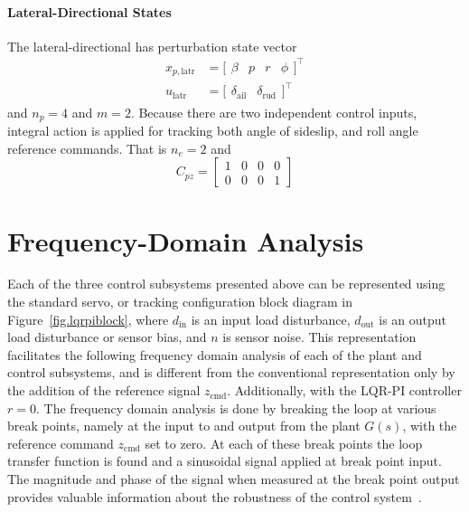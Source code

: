 \paragraph{Lateral-Directional States}
The lateral-directional has perturbation state vector
\begin{equation}
  \label{lat_statevector_eqn}
  \begin{split}
    x_{p,\text{latr}}&=
    \bigr[
    \begin{array}{cccc}
      \beta & p & r & \phi
    \end{array}\bigr]^{\top} \\
    u_{\text{latr}}&=
    \bigr[
    \begin{array}{cc}
      \delta_{\text{ail}} & \delta_{\text{rud}}
    \end{array}\bigr]^{\top}
  \end{split}
\end{equation}
and $n_{p}=4$ and $m=2$.
Because there are two independent control inputs, integral action is applied for tracking both angle of sideslip, and roll angle reference commands.
That is $n_{e}=2$ and
\begin{equation}
  C_{pz}=
  \left[
  \begin{array}{cccc}
    1 & 0 & 0 & 0 \\
    0 & 0 & 0 & 1
  \end{array}\right]
\end{equation}

\section{Frequency-Domain Analysis}

Each of the three control subsystems presented above can be represented using the standard servo, or tracking configuration block diagram in Figure~\ref{fig.lqrpiblock}, where $d_{\text{in}}$ is an input load disturbance, $d_{\text{out}}$ is an output load disturbance or sensor bias, and $n$ is sensor noise.
This representation facilitates the following frequency domain analysis of each of the plant and control subsystems, and is different from the conventional representation only by the addition of the reference signal $z_{\text{cmd}}$.
Additionally, with the LQR-PI controller $r=0$.
The frequency domain analysis is done by breaking the loop at various break points, namely at the input to and output from the plant $G(s)$, with the reference command $z_{\text{cmd}}$ set to zero.
At each of these break points the loop transfer function is found and a sinusoidal signal applied at break point input.
The magnitude and phase of the signal when measured at the break point output provides valuable information about the robustness of the control system\ \cite{book.astrommurray.2009}.

